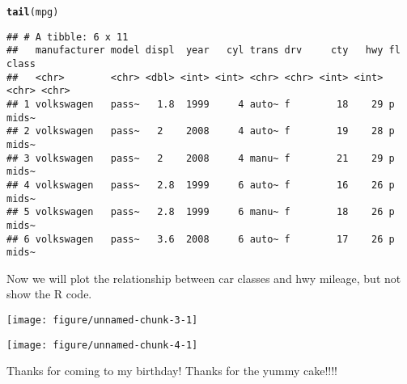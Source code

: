 \documentclass{article}\usepackage[]{graphicx}\usepackage[]{color}
\makeatletter
\def\maxwidth{ %
  \ifdim\Gin@nat@width>\linewidth
    \linewidth
  \else
    \Gin@nat@width
  \fi
}
\newcommand{\hlstd}[1]{\textcolor[rgb]{0.345,0.345,0.345}{#1}}%
\newcommand{\hlkwd}[1]{\textcolor[rgb]{0.737,0.353,0.396}{\textbf{#1}}}%
\newenvironment{kframe}{%
 \def\at@end@of@kframe{}%
 \ifinner\ifhmode%
  \def\at@end@of@kframe{\end{minipage}}%
  \begin{minipage}{\columnwidth}%
 \fi\fi%
 \def\FrameCommand##1{\hskip\@totalleftmargin \hskip-\fboxsep
 \colorbox{shadecolor}{##1}\hskip-\fboxsep
     \hskip-\linewidth \hskip-\@totalleftmargin \hskip\columnwidth}%
 \MakeFramed {\advance\hsize-\width
   \@totalleftmargin\z@ \linewidth\hsize
   \@setminipage}}%
 {\par\unskip\endMakeFramed%
 \at@end@of@kframe}
\newenvironment{knitrout}{}{} %
\def\maxwidth{ %
  \ifdim\Gin@nat@width>\linewidth
    \linewidth
  \else
    \Gin@nat@width
  \fi
}
\newcommand{\hlstd}[1]{\textcolor[rgb]{0.345,0.345,0.345}{#1}}%
\newcommand{\hlkwd}[1]{\textcolor[rgb]{0.737,0.353,0.396}{\textbf{#1}}}%
\newenvironment{kframe}{%
 \def\at@end@of@kframe{}%
 \ifinner\ifhmode%
  \def\at@end@of@kframe{\end{minipage}}%
  \begin{minipage}{\columnwidth}%
 \fi\fi%
 \def\FrameCommand##1{\hskip\@totalleftmargin \hskip-\fboxsep
 \colorbox{shadecolor}{##1}\hskip-\fboxsep
     \hskip-\linewidth \hskip-\@totalleftmargin \hskip\columnwidth}%
 \MakeFramed {\advance\hsize-\width
   \@totalleftmargin\z@ \linewidth\hsize
   \@setminipage}}%
 {\par\unskip\endMakeFramed%
 \at@end@of@kframe}
\newenvironment{knitrout}{}{} %
\makeatother
\begin{document}
\begin{knitrout}
\color{fgcolor}\begin{kframe}
\begin{alltt}
\hlkwd{tail}\hlstd{(mpg)}
\end{alltt}
\begin{verbatim}
## # A tibble: 6 x 11
##   manufacturer model displ  year   cyl trans drv     cty   hwy fl    class
##   <chr>        <chr> <dbl> <int> <int> <chr> <chr> <int> <int> <chr> <chr>
## 1 volkswagen   pass~   1.8  1999     4 auto~ f        18    29 p     mids~
## 2 volkswagen   pass~   2    2008     4 auto~ f        19    28 p     mids~
## 3 volkswagen   pass~   2    2008     4 manu~ f        21    29 p     mids~
## 4 volkswagen   pass~   2.8  1999     6 auto~ f        16    26 p     mids~
## 5 volkswagen   pass~   2.8  1999     6 manu~ f        18    26 p     mids~
## 6 volkswagen   pass~   3.6  2008     6 auto~ f        17    26 p     mids~
\end{verbatim}
\end{kframe}
\end{knitrout}

Now we will plot the relationship between car classes and hwy mileage, but not show the R code.

\begin{knitrout}
\color{fgcolor}
\texttt{[image: figure/unnamed-chunk-3-1]} 

\end{knitrout}

\begin{knitrout}
\color{fgcolor}\begin{kframe}


{\ttfamily\noindent\itshape{}}\end{kframe}
\texttt{[image: figure/unnamed-chunk-4-1]} 

\end{knitrout}

Thanks for coming to my birthday!
Thanks for the yummy cake!!!!
\end{document}
